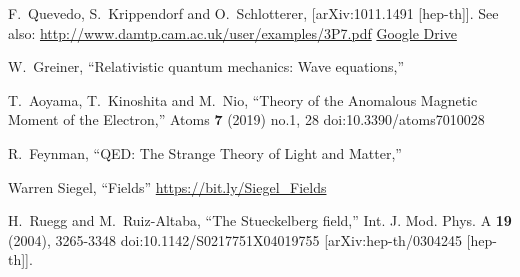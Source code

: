\begin{thebibliography}{999}
F.~Quevedo, S.~Krippendorf and O.~Schlotterer,
[arXiv:1011.1491 [hep-th]].
See also: \url{http://www.damtp.cam.ac.uk/user/examples/3P7.pdf}
\href{https://drive.google.com/file/d/1HpTXflJToqHr6cEa2b3IkWQ8E1MTjp_v/view?usp=sharing}{Google Drive}

W.~Greiner,
``Relativistic quantum mechanics: Wave equations,''

T.~Aoyama, T.~Kinoshita and M.~Nio,
``Theory of the Anomalous Magnetic Moment of the Electron,''
Atoms \textbf{7} (2019) no.1, 28
doi:10.3390/atoms7010028


R.~Feynman,
``QED: The Strange Theory of Light and Matter,''

  Warren Siegel, ``Fields'' \url{https://bit.ly/Siegel_Fields}

%
H.~Ruegg and M.~Ruiz-Altaba,
``The Stueckelberg field,''
Int. J. Mod. Phys. A \textbf{19} (2004), 3265-3348
doi:10.1142/S0217751X04019755
[arXiv:hep-th/0304245 [hep-th]].


\end{thebibliography}



